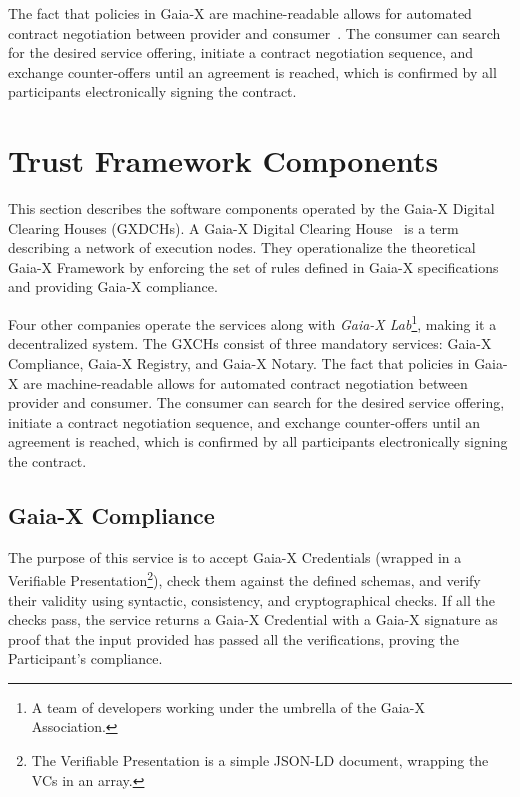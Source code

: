 The fact that policies in Gaia-X are machine-readable allows for automated contract negotiation between provider and consumer~\cite{gaiax_data_exchange_document}.
The consumer can search for the desired service offering, initiate a contract negotiation sequence, and exchange counter-offers until an agreement is reached, which is confirmed by all participants electronically signing the contract.

\section{Trust Framework Components}\label{sec:trust-framework-components}

This section describes the software components operated by the Gaia-X Digital Clearing Houses (GXDCHs).
A Gaia-X Digital Clearing House~\cite{gaiax} is a term describing a network of execution nodes.
They operationalize the theoretical Gaia-X Framework by enforcing the set of rules defined in Gaia-X specifications and providing Gaia-X compliance.

Four other companies operate the services along with \textit{Gaia-X Lab}\footnote{A team of developers working under the umbrella of the Gaia-X Association.}, making it a decentralized system.
The GXCHs consist of three mandatory services: Gaia-X Compliance, Gaia-X Registry, and Gaia-X Notary.
The fact that policies in Gaia-X are machine-readable allows for automated contract negotiation between provider and consumer.
The consumer can search for the desired service offering, initiate a contract negotiation sequence, and exchange counter-offers until an agreement is reached, which is confirmed by all participants electronically signing the contract.

\subsection{Gaia-X Compliance}\label{subsec:gaia-x-compliance}

The purpose of this service is to accept Gaia-X Credentials (wrapped in a Verifiable Presentation\footnote{The Verifiable Presentation is a simple JSON-LD document, wrapping the VCs in an array.}), check them against the defined schemas, and verify their validity using syntactic, consistency, and cryptographical checks.
If all the checks pass, the service returns a Gaia-X Credential with a Gaia-X signature as proof that the input provided has passed all the verifications, proving the Participant's compliance.


